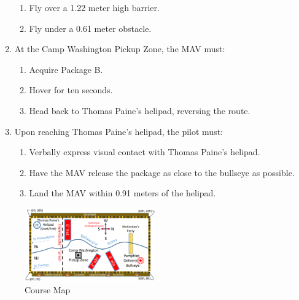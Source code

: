 \documentclass[onecolumn, oneside, letterpaper, draftclsnofoot, 10pt, compsoc]{IEEEtran}
\begin{document}
\begin{enumerate}
\begin{enumerate}
\item Fly over a 1.22 meter high barrier.
\item Fly under a 0.61 meter obstacle.
\end{enumerate}
\item At the Camp Washington Pickup Zone, the MAV must:
\begin{enumerate}
\item Acquire Package B.
\item Hover for ten seconds.
\item Head back to Thomas Paine’s helipad, reversing the route.
\end{enumerate}
\item Upon reaching Thomas Paine’s helipad, the pilot must:
\begin{enumerate}
\item Verbally express visual contact with Thomas Paine’s helipad.
\item Have the MAV release the package as close to the bullseye as possible.
\item Land the MAV within 0.91 meters of the helipad.
\end{enumerate}
\end{enumerate}
\begin{figure}[h]
    \centering
    \includegraphics[width=0.5\textwidth]{graphics/course_map.png}
    \caption{Course Map}
    \label{fig:CourseMap}
\end{figure}
\end{document}
